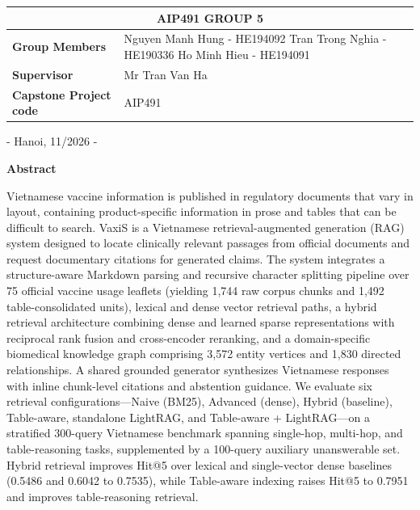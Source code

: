 \documentclass[sn-mathphys, oneside]{sn-jnl}
\begin{document}
\begin{titlepage}
\begin{center}
        \begin{tabular}{|p{4.5cm}|p{10cm}|}
            \hline
            \multicolumn{2}{|c|}{\textbf{AIP491 GROUP 5}} \\ 
            \hline
            \textbf{Group Members} & 
           Nguyen Manh Hung - HE194092  \newline
           Tran Trong Nghia - HE190336
            \newline
            Ho Minh Hieu - HE194091 \\
            \hline
            \textbf{Supervisor} &  Mr Tran Van Ha\\ %
            \hline
            \textbf{Capstone Project code} & AIP491  \\
            \hline
        \end{tabular}
    \end{center}

    \vfill

    {\large - Hanoi, 11/2026 - \par}
    
\end{titlepage}

\clearpage %
\begin{center}
    \bfseries\Large Abstract
\end{center}


Vietnamese vaccine information is published in regulatory documents that vary in layout, containing product-specific information in prose and tables that can be difficult to search. VaxiS is a Vietnamese retrieval-augmented generation (RAG) system designed to locate clinically relevant passages from official documents and request documentary citations for generated claims. The system integrates a structure-aware Markdown parsing and recursive character splitting pipeline over 75 official vaccine usage leaflets (yielding 1,744 raw corpus chunks and 1,492 table-consolidated units), lexical and dense vector retrieval paths, a hybrid retrieval architecture combining dense and learned sparse representations with reciprocal rank fusion and cross-encoder reranking, and a domain-specific biomedical knowledge graph comprising 3,572 entity vertices and 1,830 directed relationships. A shared grounded generator synthesizes Vietnamese responses with inline chunk-level citations and abstention guidance. We evaluate six retrieval configurations—Naive (BM25), Advanced (dense), Hybrid (baseline), Table-aware, standalone LightRAG, and Table-aware + LightRAG—on a stratified 300-query Vietnamese benchmark spanning single-hop, multi-hop, and table-reasoning tasks, supplemented by a 100-query auxiliary unanswerable set. Hybrid retrieval improves Hit@5 over lexical and single-vector dense baselines (0.5486 and 0.6042 to 0.7535), while Table-aware indexing raises Hit@5 to 0.7951 and improves table-reasoning retrieval.
\end{document}
